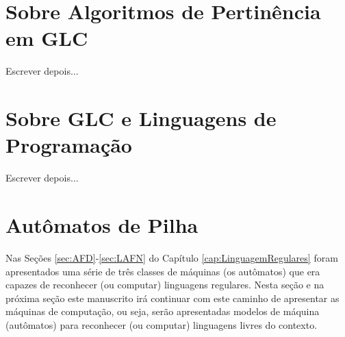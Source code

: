 \section{Sobre Algoritmos de Pertinência em GLC}\label{sec:AlgoritmosPertinenciaGLC}

Escrever depois...

\section{Sobre GLC e Linguagens de Programação}\label{sec:GLC-Programacao}

Escrever depois...

\section{Autômatos de Pilha}\label{sec:AutomatoPilha}

Nas Seções \ref{sec:AFD}-\ref{sec:LAFN} do Capítulo \ref{cap:LinguagemRegulares} foram apresentados uma série de três classes de máquinas (os autômatos) que era capazes de reconhecer (ou computar) linguagens regulares. Nesta seção e na próxima seção este manuscrito irá continuar com  este caminho de apresentar as máquinas de computação, ou seja, serão apresentadas modelos de máquina (autômatos) para reconhecer (ou computar) linguagens livres do contexto. 

